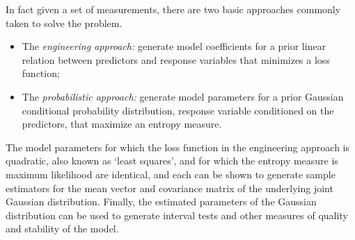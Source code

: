 \documentclass[12pt, twoside, draft]{article}
\begin{document}
In fact given a set of measurements, there are two basic approaches commonly taken to solve the problem.

\begin{itemize}
\item The \textit{engineering approach:} generate model coefficients for a prior linear relation between predictors and response variables that minimizes a loss function;
\item The \textit{probabilistic approach:} generate model parameters for a prior Gaussian conditional probability distribution, response variable conditioned on the predictors, that maximize an entropy measure.
\end{itemize}

The model parameters for which the loss function in the engineering approach is quadratic, also known as `least squares', and for which the entropy measure is maximum likelihood are identical, and each can be shown to generate sample estimators for the mean vector and covariance matrix of the underlying joint Gaussian distribution.  Finally, the estimated parameters of the Gaussian distribution can be used to generate interval tests and other measures of quality and stability of the model.
\end{document}
